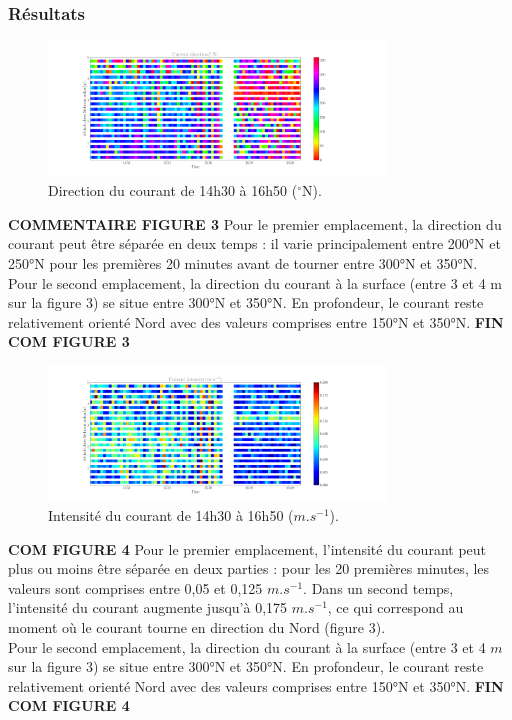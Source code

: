 \documentclass[12pt]{article}
\begin{document}
\subsubsection{Résultats}
\begin{figure}[!ht]
	\begin{center}
		\includegraphics[width=0.8\textwidth]{1703F03scatterdirection.png}
		\caption{Direction du courant de 14h30 à 16h50 ($^{\circ}$N).}
	\end{center}
\end{figure}
\textbf{COMMENTAIRE FIGURE 3} Pour le premier emplacement, la direction du courant peut être séparée en deux temps : il varie principalement entre 200°N et 250°N pour les premières 20 minutes avant de tourner entre 300°N et 350°N.\\
\indent Pour le second emplacement, la direction du courant à la surface (entre 3 et 4 m sur la figure 3) se situe entre 300°N et 350°N. En profondeur, le courant reste relativement orienté Nord avec des valeurs comprises entre 150°N et 350°N. \textbf{FIN COM FIGURE 3} \\
	
\begin{figure}[!ht]
	\begin{center}
		\includegraphics[width=0.8\textwidth]{1703F03scatterintensity.png}
		\caption{Intensité du courant de 14h30 à 16h50 ($m.s^{-1}$).}
	\end{center}
\end{figure}
\textbf{COM FIGURE 4} Pour le premier emplacement, l'intensité du courant peut plus ou moins être séparée en deux parties : pour les 20 premières minutes, les valeurs sont comprises entre 0,05 et 0,125 $m.s^{-1}$. Dans un second temps, l'intensité du courant augmente jusqu'à 0,175 $m.s^{-1}$, ce qui correspond au moment où le courant tourne en direction du Nord (figure 3).\\
\indent Pour le second emplacement, la direction du courant à la surface (entre 3 et 4 $m$ sur la figure 3) se situe entre 300°N et 350°N. En profondeur, le courant reste relativement orienté Nord avec des valeurs comprises entre 150°N et 350°N. \textbf{FIN COM FIGURE 4}\\
\end{document}
